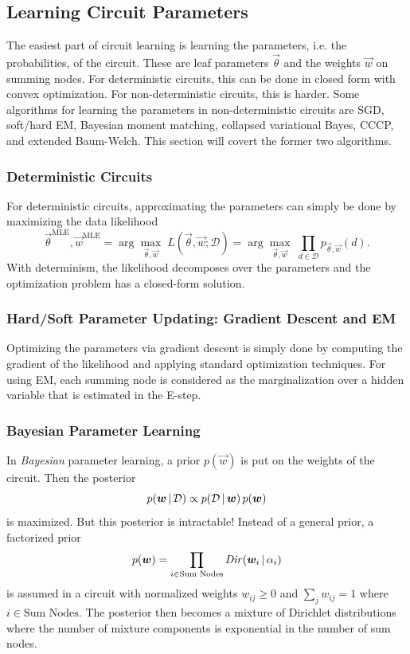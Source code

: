 		\subsection{Learning Circuit Parameters}
			The easiest part of circuit learning is learning the parameters, i.e. the probabilities, of the circuit. These are leaf parameters \(\vec{\theta}\) and the weights \(\vec{w}\) on summing nodes. For deterministic circuits, this can be done in closed form with convex optimization. For non-deterministic circuits, this is harder. Some algorithms for learning the parameters in non-deterministic circuits are SGD, soft/hard EM, Bayesian moment matching, collapsed variational Bayes, CCCP, and extended Baum-Welch. This section will covert the former two algorithms.

			\subsubsection{Deterministic Circuits}
				For deterministic circuits, approximating the parameters can simply be done by maximizing the data likelihood
				\begin{equation}
					\vec{\theta}^\mathrm{MLE}, \vec{w}^\mathrm{MLE}
						= \arg\max_{\vec{\theta}, \vec{w}} \; L(\vec{\theta}, \vec{w}; \mathcal{D})
						= \arg\max_{\vec{\theta}, \vec{w}} \; \prod_{d \in \mathcal{D}} p_{\vec{\theta}, \vec{w}}(d).
				\end{equation}
				With determinism, the likelihood decomposes over the parameters and the optimization problem has a closed-form solution.

			\subsubsection{Hard/Soft Parameter Updating: Gradient Descent and EM}
				Optimizing the parameters via gradient descent is simply done by computing the gradient of the likelihood and applying standard optimization techniques. For using EM, each summing node is considered as the marginalization over a hidden variable that is estimated in the E-step.

			\subsubsection{Bayesian Parameter Learning}
				In \emph{Bayesian} parameter learning, a prior \( p(\vec{w}) \) is put on the weights of the circuit. Then the posterior
				\begin{equation}
					p(\bm{w} \,\vert\, \mathcal{D}) \propto p(\mathcal{D} \,\vert\, \bm{w}) \, p(\bm{w})
				\end{equation}
				is maximized. But this posterior is intractable! Instead of a general prior, a factorized prior
				\begin{equation}
					p(\bm{w}) = \prod_{i \in \text{Sum Nodes}} \mathit{Dir}(\bm{w}_i \,\vert\, \alpha_i)
				\end{equation}
				is assumed in a circuit with normalized weights \( w_{ij} \geq 0 \) and \( \sum_j w_{ij} = 1 \) where \( i \in \text{Sum Nodes} \). The posterior then becomes a mixture of Dirichlet distributions where the number of mixture components is exponential in the number of sum nodes.

